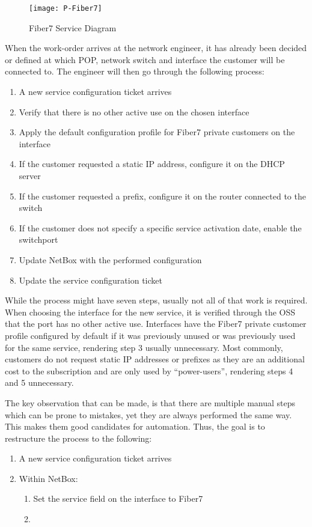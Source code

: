 \begin{figure}[h]
  \centering
  \texttt{[image: P-Fiber7]}
  \caption{Fiber7 Service Diagram}
  \label{fig:fiber7}
\end{figure}

When the work-order arrives at the network engineer, it has already been decided
or defined at which \acrshort{POP}, network switch and interface the customer
will be connected to. The engineer will then go through the following process:

\begin{enumerate}
  \item A new service configuration ticket arrives
  \item Verify that there is no other active use on the chosen interface
  \item Apply the default configuration profile for Fiber7 private customers on the interface
  \item If the customer requested a static IP address, configure it on the DHCP server
  \item If the customer requested a prefix, configure it on the router connected to the switch
  \item If the customer does not specify a specific service activation date, enable the switchport
  \item Update NetBox with the performed configuration
  \item Update the service configuration ticket
\end{enumerate}

While the process might have seven steps, usually not all of that work is required.
When choosing the interface for the new service, it is verified through the \acrshort{OSS}
that the port has no other active use.
Interfaces have the Fiber7 private customer profile configured by default
if it was previously unused or was previously used for the same service,
rendering step 3 usually unnecessary.
Most commonly, customers do not request static IP addresses or prefixes as
they are an additional cost to the subscription and are only used by ``power-users'',
rendering steps 4 and 5 unnecessary.

The key observation that can be made, is that there are multiple manual steps
which can be prone to mistakes, yet they are always performed the same way. This makes
them good candidates for automation. Thus, the goal is to restructure the process
to the following:

\begin{enumerate}
  \item A new service configuration ticket arrives
  \item Within NetBox:
  \begin{enumerate}
    \item Set the service field on the interface to Fiber7
    \item 
  \end{enumerate}
\end{enumerate}

